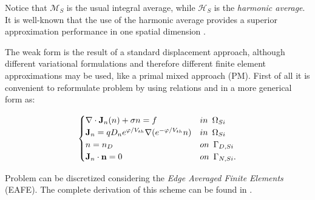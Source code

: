 Notice that $\mathcal{M}_S$ is the usual integral average, while $\mathcal{H}_S$ is the \textit{harmonic average}. It is well-known that the use of the harmonic average provides a superior approximation performance in one spatial dimension \cite{BabuskaMixMet}.

The weak form   is the result of a standard displacement approach, although different variational formulations and therefore different finite element approximations may be used, like a primal mixed approach (PM).  First of all it is convenient to reformulate problem  by using relations  and  in a more generical form as:

\begin{equation}
\label{eq: LEC system slotboom generic}
\begin{cases}
\nabla \cdot \vect{J}_n(n)  +\sigma n = f & in \psp{3} \Omega_{Si}
 \\
 \vect{J}_n = qD_n e^{\varphi/V_{th}} \nabla (e^{-\varphi/V_{th}}n) & in \psp{3} \Omega_{Si}\\
n = n_D & on \psp{3} \Gamma_{D,Si}
 \\
 \vect{J}_n \cdot \vect{n} = 0 & on \psp{3} \Gamma_{N,Si}.
\end{cases}
\end{equation}

Problem  can be discretized considering the \textit{Edge Averaged Finite Elements} (EAFE). The complete derivation of this scheme can be found in \cite{Zikatanov:EAFE1} \cite{Zikatanov:EAFE2}.


